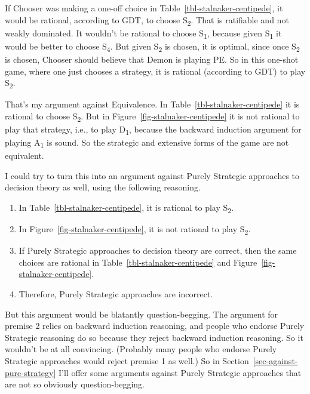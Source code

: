 \documentclass[
  12pt,
  letterpaper,
  DIV=11,
  numbers=noendperiod]{scrreprt}
\providecommand{\tightlist}{%
  \setlength{\itemsep}{0pt}\setlength{\parskip}{0pt}}\usepackage{longtable,booktabs,array}
\begin{document}
If Chooser was making a one-off choice in
Table~\ref{tbl-stalnaker-centipede}, it would be rational, according to
GDT, to choose S\textsubscript{2}. That is ratifiable and not weakly
dominated. It wouldn't be rational to choose S\textsubscript{1}, because
given S\textsubscript{1} it would be better to choose
S\textsubscript{4}. But given S\textsubscript{2} is chosen, it is
optimal, since once S\textsubscript{2} is chosen, Chooser should believe
that Demon is playing PE. So in this one-shot game, where one just
chooses a strategy, it is rational (according to GDT) to play
S\textsubscript{2}.

That's my argument against Equivalence. In
Table~\ref{tbl-stalnaker-centipede} it is rational to choose
S\textsubscript{2}. But in Figure~\ref{fig-stalnaker-centipede} it is
not rational to play that strategy, i.e., to play D\textsubscript{1},
because the backward induction argument for playing A\textsubscript{1}
is sound. So the strategic and extensive forms of the game are not
equivalent.

I could try to turn this into an argument against Purely Strategic
approaches to decision theory as well, using the following reasoning.

\begin{enumerate}
\def\labelenumi{\arabic{enumi}.}
\tightlist
\item
  In Table~\ref{tbl-stalnaker-centipede}, it is rational to play
  S\textsubscript{2}.
\item
  In Figure~\ref{fig-stalnaker-centipede}, it is not rational to play
  S\textsubscript{2}.
\item
  If Purely Strategic approaches to decision theory are correct, then
  the same choices are rational in Table~\ref{tbl-stalnaker-centipede}
  and Figure~\ref{fig-stalnaker-centipede}.
\item
  Therefore, Purely Strategic approaches are incorrect.
\end{enumerate}

But this argument would be blatantly question-begging. The argument for
premise 2 relies on backward induction reasoning, and people who endorse
Purely Strategic reasoning do so because they reject backward induction
reasoning. So it wouldn't be at all convincing. (Probably many people
who endorse Purely Strategic approaches would reject premise 1 as well.)
So in Section~\ref{sec-against-pure-strategy} I'll offer some arguments
against Purely Strategic approaches that are not so obviously
question-begging.
\end{document}
